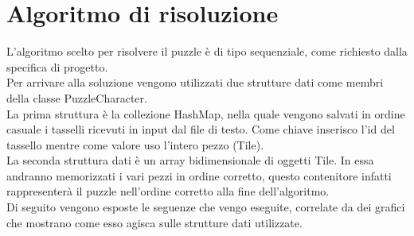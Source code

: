 % 
%
%

\section{Algoritmo di risoluzione}
L'algoritmo scelto per risolvere il puzzle è di tipo sequenziale, come richiesto dalla specifica di progetto. \\
Per arrivare alla soluzione vengono utilizzati due strutture dati come membri della classe PuzzleCharacter. \\
La prima struttura è la collezione HashMap, nella quale vengono salvati in ordine casuale i tasselli ricevuti in input dal file di testo. Come chiave inserisco l'id del tassello mentre come valore uso l'intero pezzo (Tile). \\
La seconda struttura dati è un array bidimensionale di oggetti Tile. In essa andranno memorizzati i vari pezzi in ordine corretto, questo contenitore infatti rappresenterà il puzzle nell'ordine corretto alla fine dell'algoritmo. \\
Di seguito vengono esposte le seguenze che vengo eseguite, correlate da dei grafici che mostrano come esso agisca sulle strutture dati utilizzate.

